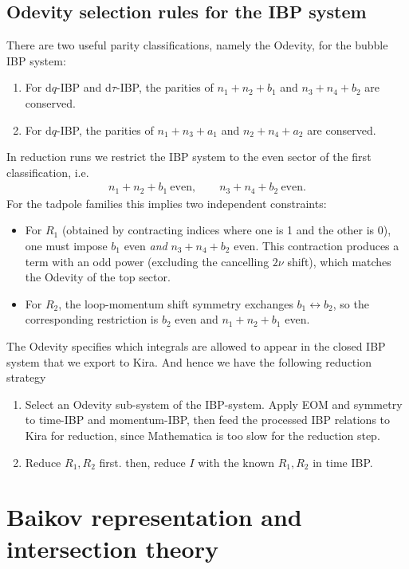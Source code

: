 \documentclass[a4paper]{article}
\def\di{{\mathrm{d}}}
\begin{document}
\subsection{Odevity selection rules for the IBP system}
There are two useful parity classifications, namely the Odevity, for the bubble IBP system:
\begin{enumerate}
\item For $\di q$-IBP and $\di \tau$-IBP, the parities of $n_1+n_2+b_1$ and $n_3+n_4+b_2$ are conserved.
\item For $\di q$-IBP, the parities of $n_1+n_3+a_1$ and $n_2+n_4+a_2$ are conserved.
\end{enumerate}
In reduction runs we restrict the IBP system to the even sector of the first classification, i.e.
\begin{align}
	n_1+n_2+b_1 \ \text{even},\qquad n_3+n_4+b_2 \ \text{even}. \label{eq:odevity_even_sector}
\end{align}
For the tadpole families this implies two independent constraints:
\begin{itemize}
\item For $R_1$ (obtained by contracting indices where one is 1 and the other is 0), one must impose $b_1$ even \emph{and} $n_3+n_4+b_2$ even. This contraction produces a term with an odd power (excluding the cancelling $2\nu$ shift), which matches the Odevity of the top sector.
\item For $R_2$, the loop-momentum shift symmetry exchanges $b_1\leftrightarrow b_2$, so the corresponding restriction is $b_2$ even and $n_1+n_2+b_1$ even.
\end{itemize}
The Odevity specifies which integrals are allowed to appear in the closed IBP system that we export to Kira. And hence we have the following reduction strategy
\begin{enumerate}
	\item Select an Odevity sub-system of the IBP-system. Apply EOM and symmetry to time-IBP and momentum-IBP, then feed the processed IBP relations to Kira for reduction, since Mathematica is too slow for the reduction step.
	\item Reduce $R_1,R_2$ first. then, reduce $I$ with the known $R_1,R_2$ in time IBP.
\end{enumerate}


\section{Baikov representation and intersection theory}
\label{sec:baikov}
\end{document}
